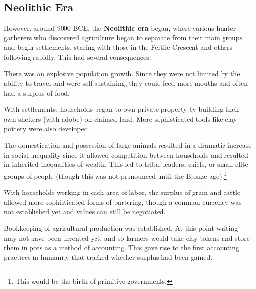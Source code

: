 \documentclass{article}
\begin{document}
  \subsection{Neolithic Era}

    \begin{technology}
      However, around 9000 BCE, the \textbf{Neolithic era} began, where various hunter gatherers who discovered agriculture began to separate from their main groups and begin settlements, staring with those in the Fertile Crescent and others following rapidly. This had several consequences. 
    \end{technology}

    \begin{society}
      There was an explosive population growth. Since they were not limited by the ability to travel and were self-sustaining, they could feed more mouths and often had a surplus of food. 
    \end{society}

    \begin{finance}
      With settlements, households began to own private property by building their own shelters (with adobe) on claimed land. More sophisticated tools like clay pottery were also developed. 
    \end{finance}

    \begin{finance}
      The domestication and possession of large animals resulted in a dramatic increase in social inequality since it allowed competition between households and resulted in inherited inequalities of wealth. This led to tribal leaders, chiefs, or small elite groups of people (though this was not pronounced until the Bronze age).\footnote{This would be the birth of primitive governments.} 
    \end{finance}

    \begin{finance}
      With households working in each area of labor, the surplus of grain and cattle allowed more sophisticated forms of bartering, though a common currency was not established yet and values can still be negotiated. 
    \end{finance}

    \begin{finance}
      Bookkeeping of agricultural production was established. At this point writing may not have been invented yet, and so farmers would take clay tokens and store them in pots as a method of accounting. This gave rise to the first accounting practices in humanity that tracked whether surplus had been gained. 
    \end{finance}
\end{document}
